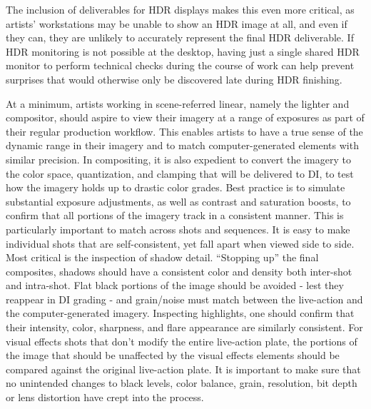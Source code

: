 The inclusion of deliverables for HDR displays makes this even more critical, as artists’ workstations may be unable to show an HDR image at all, and even if they can, they are unlikely to accurately represent the final HDR deliverable. If HDR monitoring is not possible at the desktop, having just a single shared HDR monitor to perform technical checks during the course of work can help prevent surprises that would otherwise only be discovered late during HDR finishing.

At a minimum, artists working in scene-referred linear, namely the lighter and compositor, should aspire to view their imagery at a range of exposures as part of their regular production workflow. This enables artists to have a true sense of the dynamic range in their imagery and to match computer-generated elements with similar precision. In compositing, it is also expedient to convert the imagery to the color space, quantization, and clamping that will be delivered to DI, to test how the imagery holds up to drastic color grades. Best practice is to simulate substantial exposure adjustments, as well as contrast and saturation boosts, to confirm that all portions of the imagery track in a consistent manner. This is particularly important to match across shots and sequences. It is easy to make individual shots that are self-consistent, yet fall apart when viewed side to side. Most critical is the inspection of shadow detail. “Stopping up” the final composites, shadows should have a consistent color and density both inter-shot and intra-shot. Flat black portions of the image should be avoided - lest they reappear in DI grading - and grain/noise must match between the live-action and the computer-generated imagery. Inspecting highlights, one should confirm that their intensity, color, sharpness, and flare appearance are similarly consistent. For visual effects shots that don’t modify the entire live-action plate, the portions of the image that should be unaffected by the visual effects elements should be compared against the original live-action plate. It is important to make sure that no unintended changes to black levels, color balance, grain, resolution, bit depth or lens distortion have crept into the process.

